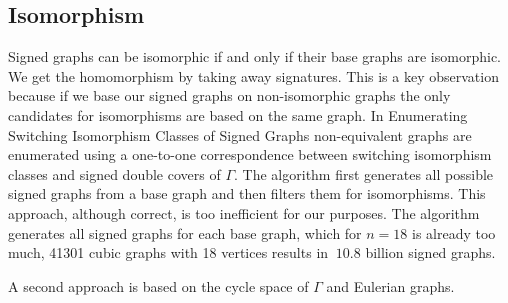 \subsection{Isomorphism}

Signed graphs can be isomorphic if and only if their base graphs are isomorphic. We get the homomorphism by taking away signatures. This is a key observation because if we base our signed graphs on non-isomorphic graphs the only candidates for isomorphisms are based on the same graph. In Enumerating Switching Isomorphism Classes of Signed Graphs\cite{enumerating-switching-isomorphisms} non-equivalent graphs are enumerated using a one-to-one correspondence between switching isomorphism classes and signed double covers of $\Gamma$. The algorithm first generates all possible signed graphs from a base graph and then filters them for isomorphisms. This approach, although correct, is too inefficient for our purposes. The algorithm generates all signed graphs for each base graph, which for $n = 18$ is already too much, 41301 cubic graphs with 18 vertices results in $~10.8$ billion signed graphs.

A second approach is based on the cycle space of $\Gamma$ and Eulerian graphs. \todo{}
